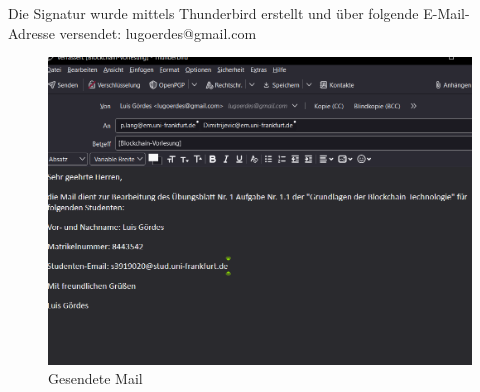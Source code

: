 \documentclass[german]{uebung}
\begin{document}
\begin{exercise}{1.1}
	Die Signatur wurde mittels Thunderbird erstellt und über folgende E-Mail-Adresse versendet: lugoerdes@gmail.com
	\begin{figure}[h]
		\centering
		\includegraphics*[scale=.5]{Abbildungen/Uebungsblatt1.png}
		\caption{Gesendete Mail}
	\end{figure}
\end{exercise}
\end{document}
